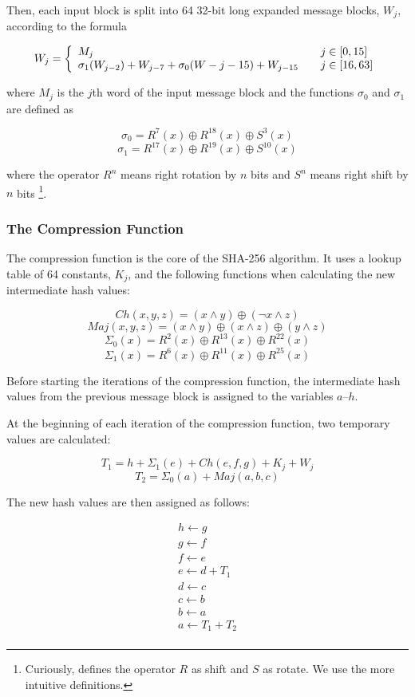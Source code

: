 Then, each input block is split into 64 32-bit long expanded message blocks, $W_j$,
according to the formula

\[ W_j = \left\{
	\begin{array}{l l}
		M_j & \quad j \in \left[0, 15\right]\\
		\sigma_1(W_{j - 2}) + W_{j - 7} + \sigma_0(W-{j - 15}) + W_{j - 15} & \quad j \in \left[16, 63\right]
	\end{array}
\right.\]

\noindent where $M_j$ is the $j$th word of the input message block and the functions
$\sigma_0$ and $\sigma_1$ are defined as

\[\sigma_0 = R^7(x) \oplus R^{18}(x) \oplus S^3(x)\]
\[\sigma_1 = R^{17}(x) \oplus R^{19}(x) \oplus S^{10}(x)\]

\noindent where the operator $R^n$ means right rotation by $n$ bits and $S^n$ means right shift by $n$
bits \footnote{Curiously, \cite{sha-spec} defines the operator $R$ as shift and $S$ as rotate.
We use the more intuitive definitions.}.

\subsubsection{The Compression Function}
The compression function is the core of the SHA-256 algorithm. It uses a lookup table
of 64 constants, $K_j$, and the following functions when calculating the new intermediate
hash values:

\[Ch(x,y,z) = (x \wedge y) \oplus (\neg x \wedge z)\]
\[Maj(x, y, z) = (x \wedge y) \oplus (x \wedge z) \oplus (y \wedge z)\]
\[\Sigma_0(x) = R^2(x) \oplus R^{13}(x) \oplus R^{22}(x)\]
\[\Sigma_1(x) = R^6(x) \oplus R^{11}(x) \oplus R^{25}(x)\]

Before starting the iterations of the compression function, the intermediate
hash values from the previous message block is assigned to the variables $a$--$h$.

At the beginning of each iteration of the compression function, two temporary
values are calculated:

\[T_1 = h + \Sigma_1(e) + Ch(e, f, g) + K_j + W_j\]
\[T_2 = \Sigma_0(a) + Maj(a, b, c)\]

The new hash values are then assigned as follows:

\[\begin{array}{l}
	h \leftarrow g \\
	g \leftarrow f \\
	f \leftarrow e \\
	e \leftarrow d + T_1\\
	d \leftarrow c \\
	c \leftarrow b \\
	b \leftarrow a \\
	a \leftarrow T_1 + T_2 \\
\end{array}\]

